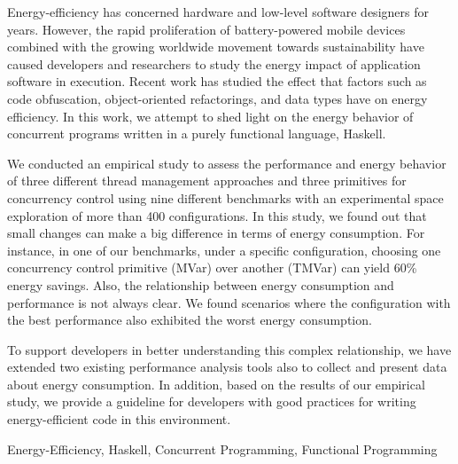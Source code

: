 Energy-efficiency has concerned hardware and low-level software designers for years. However, the rapid proliferation of battery-powered mobile devices combined with the growing worldwide movement towards sustainability have caused developers and researchers to study the energy impact of application software in execution. Recent work has studied the effect that factors such as code obfuscation, object-oriented refactorings, and data types have on energy efficiency. In this work, we attempt to shed light on the energy behavior of concurrent programs written in a purely functional language, Haskell.

We conducted an empirical study to assess the performance and energy behavior of three different thread management approaches and three primitives for concurrency control using nine different benchmarks with an experimental space exploration of more than 400 configurations. In this study, we found out that small changes can make a big difference in terms of energy consumption. For instance, in one of our benchmarks, under a specific configuration, choosing one concurrency control primitive (MVar) over another (TMVar) can yield 60\% energy savings. Also, the relationship between energy consumption and performance is not always clear. We found scenarios where the configuration with the best performance also exhibited the worst energy consumption.

To support developers in better understanding this complex relationship, we have extended two existing performance analysis tools also to collect and present data about energy consumption. In addition, based on the results of our empirical study, we provide a guideline for developers with good practices for writing energy-efficient code in this environment.

\begin{keywords}
Energy-Efficiency, Haskell, Concurrent Programming, Functional Programming
\end{keywords}

